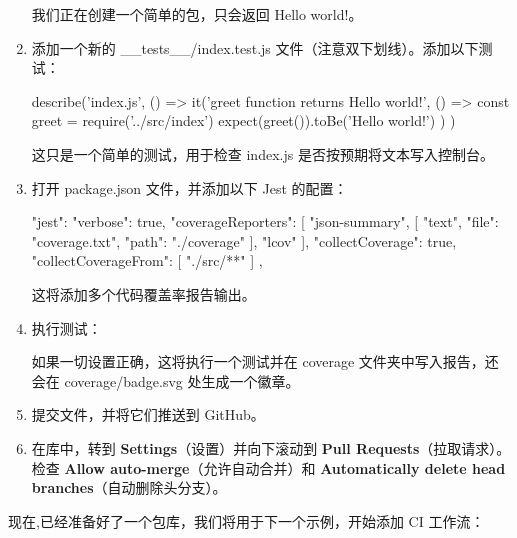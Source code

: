 \begin{enumerate}
我们正在创建一个简单的包，只会返回 Hello world!。

\item 
添加一个新的 \_\_tests\_\_/index.test.js 文件（注意双下划线）。添加以下测试：

\begin{shell}
describe('index.js', () => {
  it('greet function returns Hello world!', () => {
    const greet = require('../src/index')
    expect(greet()).toBe('Hello world!')
  })
})
\end{shell}

这只是一个简单的测试，用于检查 index.js 是否按预期将文本写入控制台。

\item 
打开 package.json 文件，并添加以下 Jest 的配置：

\begin{shell}
"jest": {
  "verbose": true,
  "coverageReporters": [
    "json-summary",
    [
      "text",
      {
        "file": "coverage.txt",
        "path": "./coverage"
      }
    ],
    "lcov"
  ],
  "collectCoverage": true,
  "collectCoverageFrom": [
    "./src/**"
  ]
},
\end{shell}

这将添加多个代码覆盖率报告输出。

\item 
执行测试： 


如果一切设置正确，这将执行一个测试并在 coverage 文件夹中写入报告，还会在 coverage/badge.svg 处生成一个徽章。

\item 
提交文件，并将它们推送到 GitHub。

\item 
在库中，转到 \textbf{Settings}（设置）并向下滚动到 \textbf{Pull Requests}（拉取请求）。检查 \textbf{Allow auto-merge}（允许自动合并）和 \textbf{Automatically delete head branches}（自动删除头分支）。
\end{enumerate}


现在,已经准备好了一个包库，我们将用于下一个示例，开始添加 CI 工作流：

